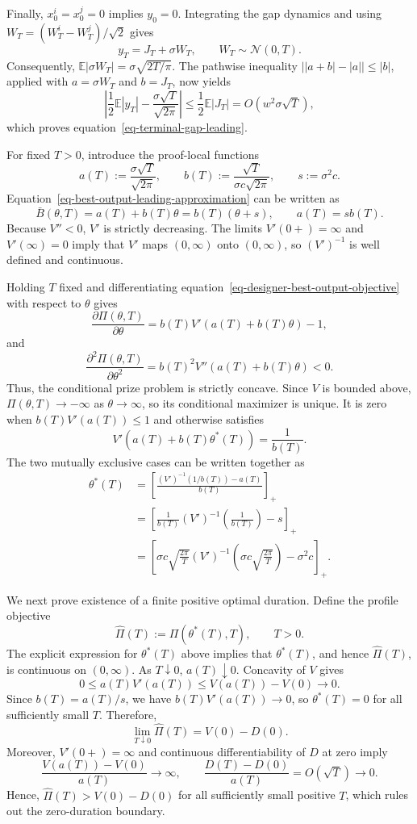 \documentclass[mnsc]{informs3}
\begin{document}
\begin{APPENDICES}
Finally, $x_0^i=x_0^j=0$ implies $y_0=0$. Integrating the gap dynamics and using $W_T=(W_T^i-W_T^j)/\sqrt2$ gives
\[
y_T=J_T+\sigma W_T,
\qquad W_T\sim\mathcal N(0,T).
\]
Consequently, $\mathbb E|\sigma W_T|=\sigma\sqrt{2T/\pi}$. The pathwise inequality
$\bigl||a+b|-|a|\bigr|\leq|b|$, applied with $a=\sigma W_T$ and $b=J_T$, now yields
\[
\left|\frac12\mathbb E|y_T|
-\frac{\sigma\sqrt T}{\sqrt{2\pi}}\right|
\leq\frac12\mathbb E|J_T|
=O(w^2\sigma\sqrt T),
\]
which proves equation~\eqref{eq-terminal-gap-leading}.
\Halmos
\endproof

For fixed $T>0$, introduce the proof-local functions
\[
a(T):=\frac{\sigma\sqrt T}{\sqrt{2\pi}},
\qquad
b(T):=\frac{\sqrt T}{\sigma c\sqrt{2\pi}},
\qquad
s:=\sigma^2c.
\]
Equation~\eqref{eq-best-output-leading-approximation} can be written as
\[
\bar B(\theta,T)=a(T)+b(T)\theta=b(T)(\theta+s),
\qquad a(T)=s b(T).
\]
Because $V''<0$, $V'$ is strictly decreasing. The limits $V'(0+)=\infty$ and $V'(\infty)=0$ imply that $V'$ maps $(0,\infty)$ onto $(0,\infty)$, so $(V')^{-1}$ is well defined and continuous.

Holding $T$ fixed and differentiating equation~\eqref{eq-designer-best-output-objective} with respect to $\theta$ gives
\[
\frac{\partial\Pi(\theta,T)}{\partial\theta}
=b(T)V'\!\left(a(T)+b(T)\theta\right)-1,
\]
and
\[
\frac{\partial^2\Pi(\theta,T)}{\partial\theta^2}
=b(T)^2V''\!\left(a(T)+b(T)\theta\right)<0.
\]
Thus, the conditional prize problem is strictly concave. Since $V$ is bounded above, $\Pi(\theta,T)\to-\infty$ as $\theta\to\infty$, so its conditional maximizer is unique. It is zero when $b(T)V'(a(T))\leq1$ and otherwise satisfies
\[
V'\!\left(a(T)+b(T)\theta^*(T)\right)=\frac{1}{b(T)}.
\]
The two mutually exclusive cases can be written together as
\[
\begin{aligned}
\theta^*(T)
&=\left[\frac{(V')^{-1}(1/b(T))-a(T)}{b(T)}\right]_+\\
&=\left[\frac{1}{b(T)}(V')^{-1}\!\left(\frac{1}{b(T)}\right)-s\right]_+\\
&=\left[
\sigma c\sqrt{\frac{2\pi}{T}}
(V')^{-1}\!\left(\sigma c\sqrt{\frac{2\pi}{T}}\right)
-\sigma^2c
\right]_+.
\end{aligned}
\]

We next prove existence of a finite positive optimal duration. Define the profile objective
\[
\widehat\Pi(T):=\Pi(\theta^*(T),T),
\qquad T>0.
\]
The explicit expression for $\theta^*(T)$ above implies that $\theta^*(T)$, and hence $\widehat\Pi(T)$, is continuous on $(0,\infty)$.
As $T\downarrow0$, $a(T)\downarrow0$. Concavity of $V$ gives
\[
0\leq a(T)V'(a(T))\leq V(a(T))-V(0)\longrightarrow0.
\]
Since $b(T)=a(T)/s$, we have $b(T)V'(a(T))\to0$, so $\theta^*(T)=0$ for all sufficiently small $T$. Therefore,
\[
\lim_{T\downarrow0}\widehat\Pi(T)=V(0)-D(0).
\]
Moreover, $V'(0+)=\infty$ and continuous differentiability of $D$ at zero imply
\[
\frac{V(a(T))-V(0)}{a(T)}\longrightarrow\infty,
\qquad
\frac{D(T)-D(0)}{a(T)}=O(\sqrt T)\longrightarrow0.
\]
Hence, $\widehat\Pi(T)>V(0)-D(0)$ for all sufficiently small positive $T$, which rules out the zero-duration boundary.


\end{APPENDICES}
\end{document}
